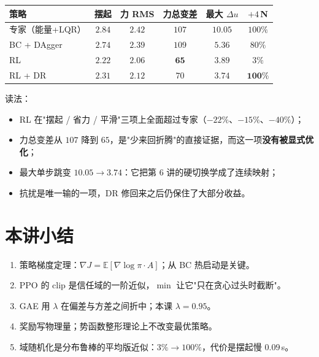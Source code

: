 \begin{center}
\small
\begin{tabular}{@{}lccccc@{}}
\toprule
策略 & 摆起 & 力 RMS & 力总变差 & 最大 $\Delta u$ & $+4$\,N \\
\midrule
专家（能量+LQR） & $2.84$ & $2.42$ & $107$ & $10.05$ & $100\%$ \\
BC + DAgger & $2.74$ & $2.39$ & $109$ & $5.36$ & $80\%$ \\
RL & $\mathbf{2.22}$ & $\mathbf{2.06}$ & $\mathbf{65}$ & $3.89$ & $3\%$ \\
RL + DR & $2.31$ & $2.12$ & $70$ & $\mathbf{3.74}$ & $\mathbf{100\%}$ \\
\bottomrule
\end{tabular}
\end{center}

读法：
\begin{itemize}[leftmargin=2em,itemsep=2pt]
  \item RL 在"摆起 / 省力 / 平滑"三项上全面超过专家（$-22\%$、$-15\%$、$-40\%$）；
  \item 力总变差从 $107$ 降到 $65$，是"少来回折腾"的直接证据，而这一项\textbf{没有被显式优化}；
  \item 最大单步跳变 $10.05\to3.74$：它把第 6 讲的硬切换学成了连续映射；
  \item 抗扰是唯一输的一项，DR 修回来之后仍保住了大部分收益。
\end{itemize}

\section{本讲小结}
\begin{enumerate}[leftmargin=2em,itemsep=2pt]
  \item 策略梯度定理：$\nabla J=\mathbb{E}[\nabla\log\pi\cdot A]$；从 BC 热启动是关键。
  \item PPO 的 clip 是信任域的一阶近似，$\min$ 让它"只在贪心过头时截断"。
  \item GAE 用 $\lambda$ 在偏差与方差之间折中；本课 $\lambda=0.95$。
  \item 奖励写物理量；势函数整形理论上不改变最优策略。
  \item 域随机化是分布鲁棒的平均版近似：$3\%\to100\%$，代价是摆起慢 $0.09$\,s。
\end{enumerate}

